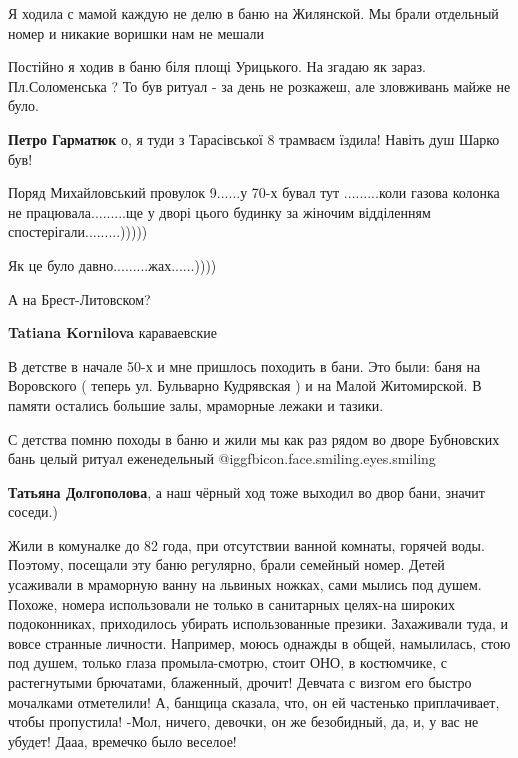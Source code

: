 \begin{itemize}

Я ходила с мамой каждую не делю в баню на Жилянской. Мы брали отдельный номер и
никакие воришки нам не мешали


Постійно я ходив в баню біля площі Урицького. На згадаю як зараз.
Пл.Соломенська ?  То був ритуал - за день не розкажеш, але зловживань майже не
було.

\begin{itemize} %
\textbf{Петро Гарматюк} о, я туди з Тарасівської 8 трамваєм їздила! Навіть душ Шарко був!
\end{itemize} %


Поряд Михайловський провулок 9......у 70-х бувал тут .........коли газова колонка не
працювала.........ще у дворі цього будинку за жіночим відділенням
спостерігали.........)))))

Як це було давно.........жах......))))

А на Брест-Литовском?

\textbf{Tatiana Kornilova} караваевские


В детстве в начале 50-х и мне пришлось походить в бани. Это были: баня на
Воровского ( теперь ул. Бульварно Кудрявская ) и на Малой Житомирской. В памяти
остались большие залы, мраморные лежаки и тазики.

С детства помню походы в баню и жили мы как раз рядом во дворе Бубновских бань
целый ритуал еженедельный @igg{fbicon.face.smiling.eyes.smiling} 


\textbf{Татьяна Долгополова}, а наш чёрный ход тоже выходил во двор бани, значит соседи.)


Жили в комуналке до 82 года, при отсутствии ванной комнаты, горячей
воды. Поэтому, посещали эту баню регулярно, брали семейный номер. Детей усаживали в
мраморную ванну на львиных ножках, сами мылись под душем. Похоже, номера
использовали не только в санитарных целях-на широких подоконниках, приходилось
убирать использованные презики. Захаживали туда, и вовсе странные
личности. Например, моюсь однажды в общей, намылилась, стою под душем, только глаза
промыла-смотрю, стоит ОНО, в костюмчике, с растегнутыми
брючатами, блаженный, дрочит! Девчата с визгом его быстро мочалками отметелили!
А, банщица сказала, что, он ей частенько приплачивает, чтобы пропустила!
-Мол, ничего, девочки, он же безобидный, да, и, у вас не убудет! Дааа, времечко было
веселое!


\end{itemize}
